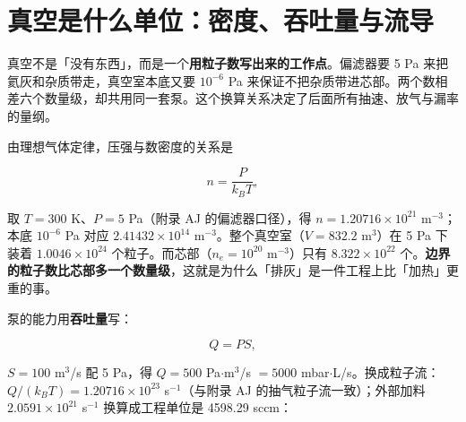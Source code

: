 
\section{真空是什么单位：密度、吞吐量与流导}
\label{sec:app-ao-units}

真空不是「没有东西」，而是一个\textbf{用粒子数写出来的工作点}。偏滤器要 5 Pa 来把氦灰和杂质带走，真空室本底又要 $10^{-6}$ Pa 来保证不把杂质带进芯部。两个数相差六个数量级，却共用同一套泵。这个换算关系决定了后面所有抽速、放气与漏率的量纲。

由理想气体定律，压强与数密度的关系是

\begin{equation}
n=\frac{P}{k_BT},
\label{eq:app-ao-density}
\end{equation}

取 $T=300$ K、$P=5$ Pa（附录 AJ 的偏滤器口径），得 $n=1.20716\times10^{21}$ m$^{-3}$；本底 $10^{-6}$ Pa 对应 $2.41432\times10^{14}$ m$^{-3}$。整个真空室（$V=832.2$ m$^3$）在 5 Pa 下装着 $1.0046\times10^{24}$ 个粒子。而芯部（$n_e=10^{20}$ m$^{-3}$）只有 $8.322\times10^{22}$ 个。\textbf{边界的粒子数比芯部多一个数量级}，这就是为什么「排灰」是一件工程上比「加热」更重的事。

泵的能力用\textbf{吞吐量}写：

\begin{equation}
Q=PS,
\label{eq:app-ao-throughput}
\end{equation}

$S=100$ m$^3$/s 配 5 Pa，得 $Q=500$ Pa$\cdot$m$^3$/s $=5000$ mbar$\cdot$L/s。换成粒子流：$Q/(k_BT)=1.20716\times10^{23}$ s$^{-1}$（与附录 AJ 的抽气粒子流一致）；外部加料 $2.0591\times10^{21}$ s$^{-1}$ 换算成工程单位是 4598.29 sccm：

